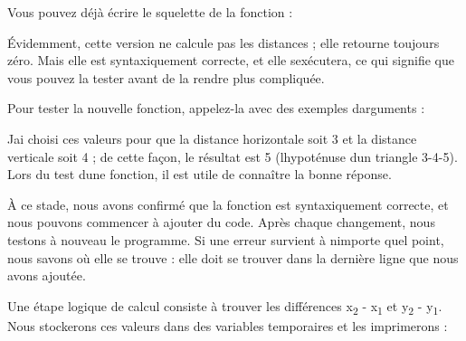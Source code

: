 Vous pouvez déjà écrire le squelette de la fonction :

\begin{Shaded}
\begin{Highlighting}[]
     
\end{Highlighting}
\end{Shaded}

Évidemment, cette version ne calcule pas les distances ; elle retourne
toujours zéro. Mais elle est syntaxiquement correcte, et elle
s\textquotesingle exécutera, ce qui signifie que vous pouvez la tester
avant de la rendre plus compliquée.

Pour tester la nouvelle fonction, appelez-la avec des exemples
d\textquotesingle arguments :

\begin{Shaded}
\begin{Highlighting}[]
\OperatorTok{\textgreater{}\textgreater{}\textgreater{}}\NormalTok{, }\NormalTok{, }\NormalTok{, }\NormalTok{)}
\end{Highlighting}
\end{Shaded}

J\textquotesingle ai choisi ces valeurs pour que la distance horizontale
soit 3 et la distance verticale soit 4 ; de cette façon, le résultat est
5 (l\textquotesingle hypoténuse d\textquotesingle un triangle 3-4-5).
Lors du test d\textquotesingle une fonction, il est utile de connaître
la bonne réponse.

À ce stade, nous avons confirmé que la fonction est syntaxiquement
correcte, et nous pouvons commencer à ajouter du code. Après chaque
changement, nous testons à nouveau le programme. Si une erreur survient
à n\textquotesingle importe quel point, nous savons où elle se trouve :
elle doit se trouver dans la dernière ligne que nous avons ajoutée.

Une étape logique de calcul consiste à trouver les différences
x\textsubscript{2} - x\textsubscript{1} et y\textsubscript{2} -
y\textsubscript{1}. Nous stockerons ces valeurs dans des variables
temporaires et les imprimerons :

\begin{Shaded}
\begin{Highlighting}[]
\OperatorTok{=}\OperatorTok{{-}}
\OperatorTok{=}\OperatorTok{{-}}
    \NormalTok{(}
    \NormalTok{(}
     
\end{Highlighting}
\end{Shaded}

